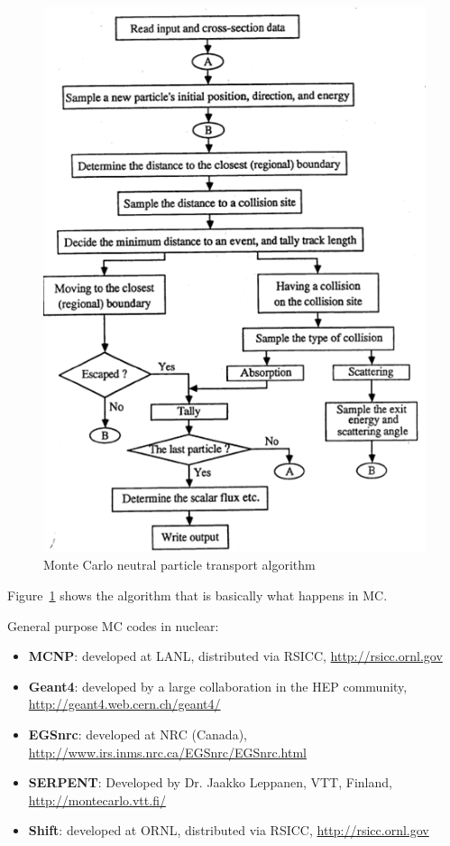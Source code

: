 \documentclass[12pt]{article}
\begin{document}
\begin{figure}[h!]
\begin{center}
  \includegraphics[height=6 in,clip]{../figs/MC-algorithm}
\end{center}
  \caption{Monte Carlo neutral particle transport algorithm}
  \label{fig:mc-algo}
\end{figure}
%
Figure~\ref{fig:mc-algo} shows the algorithm that is basically what happens in MC. 

General purpose MC codes in nuclear:
\begin{itemize}
\item \textbf{MCNP}: developed at LANL, distributed via RSICC, \href{http://rsicc.ornl.gov}{http://rsicc.ornl.gov}
\item \textbf{Geant4}: developed by a large collaboration in the HEP community, \href{ http://geant4.web.cern.ch/geant4/}{http://geant4.web.cern.ch/geant4/}
\item \textbf{EGSnrc}: developed at NRC (Canada), \href{http://www.irs.inms.nrc.ca/EGSnrc/EGSnrc.html}{http://www.irs.inms.nrc.ca/EGSnrc/EGSnrc.html}
\item \textbf{SERPENT}: Developed by Dr. Jaakko Leppanen, VTT, Finland, \href{ http://montecarlo.vtt.fi/}{http://montecarlo.vtt.fi/}
\item \textbf{Shift}: developed at ORNL, distributed via RSICC, \href{http://rsicc.ornl.gov}{http://rsicc.ornl.gov}
\end{itemize}
\end{document}
